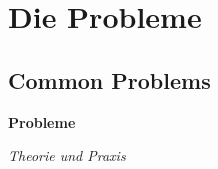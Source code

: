 \documentclass[aspectratio=43,x11names]{beamer}
\begin{document}

\section{Die Probleme}


\subsection{Common Problems}

\begin{frame}
\begin{center}
\Huge
\textbf{Probleme} \bigskip

\huge \textit{Theorie und Praxis}
\end{center}
\end{frame}
\end{document}
